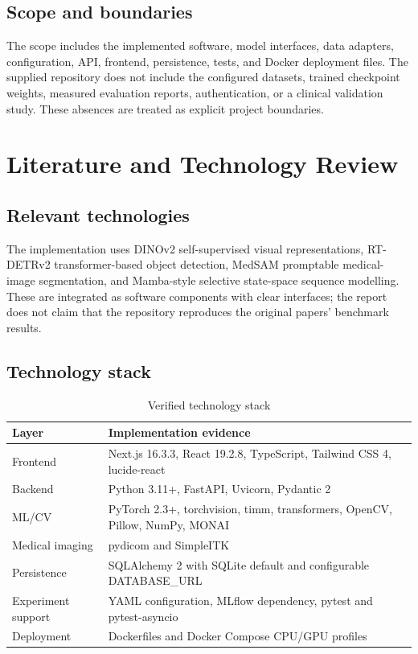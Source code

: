 \documentclass[12pt,a4paper]{article}
\begin{document}
\subsection{Scope and boundaries}
The scope includes the implemented software, model interfaces, data adapters, configuration, API, frontend, persistence, tests, and Docker deployment files. The supplied repository does not include the configured datasets, trained checkpoint weights, measured evaluation reports, authentication, or a clinical validation study. These absences are treated as explicit project boundaries.

\section{Literature and Technology Review}
\subsection{Relevant technologies}
The implementation uses DINOv2 self-supervised visual representations, RT-DETRv2 transformer-based object detection, MedSAM promptable medical-image segmentation, and Mamba-style selective state-space sequence modelling. These are integrated as software components with clear interfaces; the report does not claim that the repository reproduces the original papers' benchmark results.

\subsection{Technology stack}
\begin{table}[H]
\centering\small
\caption{Verified technology stack}
\begin{tabularx}{\textwidth}{lX}
\toprule
Layer & Implementation evidence\\\midrule
Frontend & Next.js 16.3.3, React 19.2.8, TypeScript, Tailwind CSS 4, lucide-react\\
Backend & Python 3.11+, FastAPI, Uvicorn, Pydantic 2\\
ML/CV & PyTorch 2.3+, torchvision, timm, transformers, OpenCV, Pillow, NumPy, MONAI\\
Medical imaging & pydicom and SimpleITK\\
Persistence & SQLAlchemy 2 with SQLite default and configurable DATABASE\_URL\\
Experiment support & YAML configuration, MLflow dependency, pytest and pytest-asyncio\\
Deployment & Dockerfiles and Docker Compose CPU/GPU profiles\\
\bottomrule
\end{tabularx}
\end{table}
\end{document}
